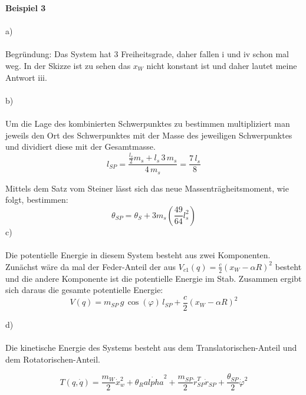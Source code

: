 \newpage
\noindent
\textbf{Beispiel 3} \\ \\
a) \\ \\
\noindent
Begründung: Das System hat 3 Freiheitsgrade, daher fallen i und iv schon mal weg. In der Skizze ist zu sehen das \(x_W\) nicht konstant ist und daher lautet meine Antwort iii. \\ \\ b) \\ \\ \noindent
Um die Lage des kombinierten Schwerpunktes zu bestimmen multipliziert man jeweils den Ort des Schwerpunktes mit der Masse des jeweiligen Schwerpunktes und dividiert diese mit der Gesamtmasse.
\[l_{SP} = \frac{\frac{l_s}{2}m_s+l_s\,3\,m_s}{4\,m_s} = \frac{7\,l_s}{8}\]

\noindent
Mittels dem Satz vom Steiner lässt sich das neue Massenträgheitsmoment, wie folgt, bestimmen:
\[\theta_{SP} = \theta_S+3 m_s \left(\frac{49}{64}l_s^2 \right)\] %
c) \\\\
\noindent
Die potentielle Energie in diesem System besteht aus zwei Komponenten. Zunächst wäre da mal der Feder-Anteil der aus \(V_{c1}(q) = \frac{c}{2}(x_W - \alpha R)^2 \) besteht und die andere Komponente ist die potentielle Energie im Stab. Zusammen ergibt sich daraus die gesamte potentielle Energie: \[V(q) = m_{SP}\, g\, \cos{(\varphi)}\, l_{SP} + \frac{c}{2} (x_W - \alpha R)^2\]

\noindent d) \\\\

\noindent
Die kinetische Energie des Systems besteht aus dem Translatorischen-Anteil und dem Rotatorischen-Anteil.

\[T(q,\dot{q}) = \frac{m_W}{2} \dot{x}_w^2 + \theta_R \dot{alpha}^2 + \frac{m_{SP}}{2} \dot{r}_{SP}^T\dot{r}_{SP} + \frac{\theta_{SP}}{2}\dot{\varphi}^2 \]

